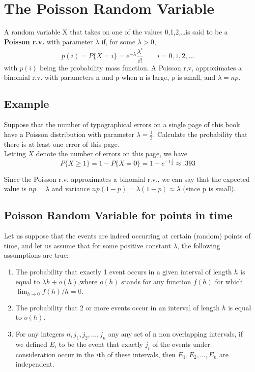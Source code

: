 \section{The Poisson Random Variable}
\begin{definition}[Poisson R.V.]
    A random variable X that takes on one of the values 0,1,2,\dots is said to be a \textbf{Poisson r.v.} with parameter $\lambda$ if, for some $\lambda > 0$, \[p(i) = P\{X = i\} = e^{-\lambda}\frac{\lambda^i}{i!}\qquad i = 0,1,2,\dots\]
    with $p(i)$ being the probability mass function.  A Poisson r,v, approximates a binomial r.v. with parameters n and p when n is large, p is small, and $\lambda = np$.
\end{definition}
\subsection*{Example}
Suppose that the number of typographical errors on a single page of this book have a Poisson distribution with parameter $\lambda = \frac{1}{2}$. Calculate the probability that there is at least one error of this page. \\
Letting $X$ denote the number of errors on this page, we have \[P\{X\geq 1\} = 1 - P\{X = 0\} = 1 - e^{-1\frac{1}{2}}\approx .393\]

Since the Poisson r.v. approximates a binomial r.v., we can say that the expected value is $np = \lambda$ and variance $np(1-p) = \lambda (1-p)\approx\lambda \text{ (since p is small)}$.\\
\subsection{Poisson Random Variable for points in time}
Let us suppose that the events are indeed occurring at certain (random) points of time, and let us assume that for some positive constant $\lambda$, the following assumptions are true:
\begin{enumerate}
    \item The probability that exactly 1 event occurs in a given interval of length $h$ is equal to $\lambda h + o(h)$,where $o(h)$ stands for any function $f(h)$ for which $\lim_{h\rightarrow 0} f(h)/h = 0$.
    \item The probability that 2 or more events occur in an interval of length $h$ is equal to $o(h)$.
    \item For any integers $n, j_1, j_2, \dots, j_n$ any any set of n non overlapping intervals, if we defined $E_i$ to be the event that exactly $j_i$ of the events under consideration occur in the $i$th of these intervals, then $E_1,E_2,\dots, E_n$ are independent.
\end{enumerate}
